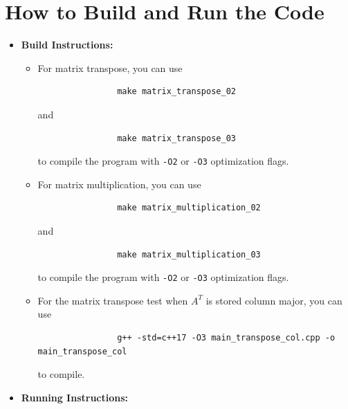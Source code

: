 \documentclass[11pt]{article}
\begin{document}
\section{How to Build and Run the Code}
\label{sec:build_run}
\begin{itemize}
    \item \textbf{Build Instructions:} 
        \begin{itemize}
            \item For matrix transpose, you can use
            \begin{verbatim}
                make matrix_transpose_02
            \end{verbatim}
            and
            \begin{verbatim}
                make matrix_transpose_03
            \end{verbatim}
            to compile the program with \verb|-O2| or \verb|-O3| optimization flags.
            \item For matrix multiplication, you can use
            \begin{verbatim}
                make matrix_multiplication_02
            \end{verbatim}
            and
            \begin{verbatim}
                make matrix_multiplication_03
            \end{verbatim}
            to compile the program with \verb|-O2| or \verb|-O3| optimization flags.
            \item For the matrix transpose test when $A^T$ is stored column major, you can use
            \begin{verbatim}
                g++ -std=c++17 -O3 main_transpose_col.cpp -o main_transpose_col
            \end{verbatim}
            to compile.
        \end{itemize}
    \item \textbf{Running Instructions:} 
    

\end{itemize}
\end{document}
